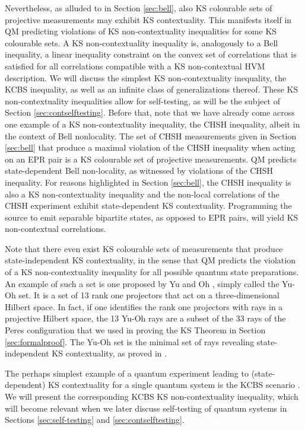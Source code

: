 Nevertheless, as alluded to in Section \ref{sec:bell}, also KS colourable sets of projective measurements may exhibit KS contextuality. This manifests itself in QM predicting violations of KS non-contextuality inequalities for some KS colourable sets. A KS non-contextuality inequality is, analogously to a Bell inequality, a linear inequality constraint on the convex set of correlations that is satisfied for all correlations compatible with a KS non-contextual HVM description. We will discuss the simplest KS non-contextuality inequality, the KCBS inequality, as well as an infinite class of generalizations thereof. These KS non-contextuality inequalities allow for self-testing, as will be the subject of Section \ref{sec:contselftesting}. Before that, note that we have already come across one example of a KS non-contextuality inequality, the CHSH inequality, albeit in the context of Bell nonlocality. The set of CHSH measurements given in Section \ref{sec:bell} that produce a maximal violation of the CHSH inequality when acting on an EPR pair is a KS colourable set of projective measurements. QM predicts state-dependent Bell non-locality, as witnessed by violations of the CHSH inequality. For reasons highlighted in Section \ref{sec:bell}, the CHSH inequality is also a KS non-contextuality inequality and the non-local correlations of the CHSH experiment exhibit state-dependent KS contextuality. Programming the source to emit separable bipartite states, as opposed to EPR pairs, will yield KS non-contextual correlations.

Note that there even exist KS colourable sets of measurements that produce state-independent KS contextuality, in the sense that QM predicts the violation of a KS non-contextuality inequality for all possible quantum state preparations. An example of such a set is one proposed by Yu and Oh \cite{Yu2012}, simply called the Yu-Oh set. It is a set of 13 rank one projectors that act on a three-dimensional Hilbert space. In fact, if one identifies the rank one projectors with rays in a projective Hilbert space, the 13 Yu-Oh rays are a subset of the 33 rays of the Peres configuration that we used in proving the KS Theorem in Section \ref{sec:formalproof}. The Yu-Oh set is the minimal set of rays revealing state-independent KS contextuality, as proved in \cite{Cabello2016a}.

The perhaps simplest example of a quantum experiment leading to (state-dependent) KS contextuality for a single quantum system is the KCBS scenario \cite{Klyachko2008}. We will present the corresponding KCBS KS non-contextuality inequality, which will become relevant when we later discuss self-testing of quantum systems in Sections \ref{sec:self-testing} and \ref{sec:contselftesting}. 

